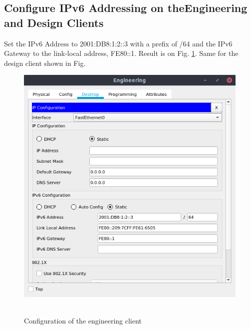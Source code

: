 \documentclass[conference]{IEEEtran}
\begin{document}
\subsection{Configure IPv6 Addressing on theEngineering and Design Clients}
Set the IPv6 Address to 2001:DB8:1:2::3 with a prefix of /64 and the IPv6 Gateway to the link-local address, FE80::1. Result is on Fig. \ref{client_engineering}. Same for the design client shown in Fig. 

\begin{center}
\begin{figure}[h]
\includegraphics[scale=0.45]{resources/q33.png}\
\caption{Configuration of the engineering client}
\label{client_engineering}
\end{figure}
\end{center}
\end{document}
